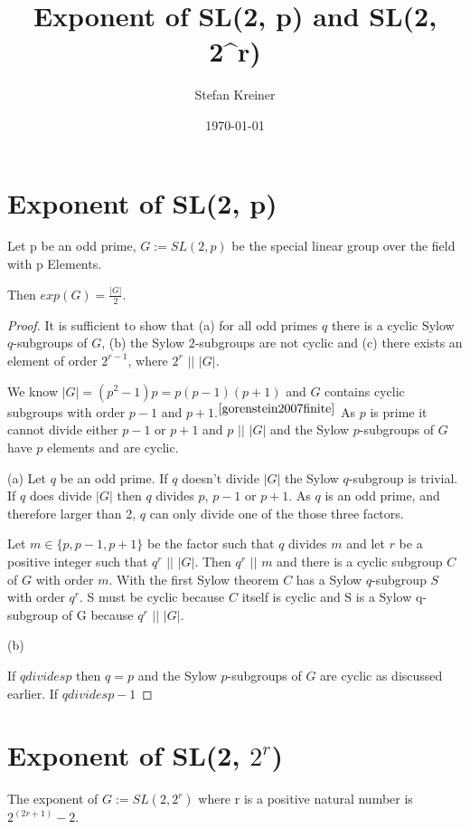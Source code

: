 \documentclass[a4paper,10pt]{article}
\title{Exponent of SL(2, p) and SL(2, 2^r)}
\author{Stefan Kreiner}
\date{\today}
\begin{document}
\tableofcontents

\section{Exponent of SL(2, p)}
\begin{theorem}
	Let p be an odd prime, $G := SL(2, p)$ be the special linear group over the field with p Elements.

	Then $exp(G) = \frac{|G|}{2}$.
\end{theorem}

\begin{proof}
It is sufficient to show that (a) for all odd primes $q$ there is a cyclic Sylow $q$-subgroups of $G$, (b) the Sylow $2$-subgroups are not cyclic and (c) there exists an element of order $2^{r-1}$, where $2^r$ $\vert\vert$ $|G|$.

We know $|G| = (p^2-1)p = p(p-1)(p+1)$ and $G$ contains cyclic subgroups with order $p-1$ and $p+1$.$^{\cite{gorenstein2007finite}}$ As $p$ is prime it cannot divide either $p-1$ or $p+1$ and $p$ $\vert\vert$ $|G|$ and the Sylow $p$-subgroups of $G$ have $p$ elements and are cyclic. 

(a) Let $q$ be an odd prime. If $q$ doesn't divide $|G|$ the Sylow $q$-subgroup is trivial. If $q$ does divide $|G|$ then $q$ divides $p$, $p-1$ or $p+1$. As $q$ is an odd prime, and therefore larger than 2, $q$ can only divide one of the those three factors. 

Let $m \in \{ p, p-1, p+1\}$ be the factor such that $q$ divides $m$ and let $r$ be a positive integer such that $q^r$ $\vert\vert$ $|G|$. Then $q^r$ $\vert\vert$ $m$ and there is a cyclic subgroup $C$ of $G$ with order $m$. With the first Sylow theorem $C$ has a Sylow $q$-subgroup $S$ with order $q^r$. S must be cyclic because $C$ itself is cyclic and S is a Sylow q-subgroup of G because $q^r$ $\vert\vert$ $|G|$.

(b)

If $q divides p$ then $q = p$ and the Sylow $p$-subgroups of $G$ are cyclic as discussed earlier. If $q divides p-1$
\end{proof}

\section{Exponent of SL(2, $2^r$)}

\begin{theorem}
	The exponent of $G := SL(2, 2^r)$ where r is a positive natural number is $2^{(2r+1)} - 2$.
\end{theorem}
\end{document}
